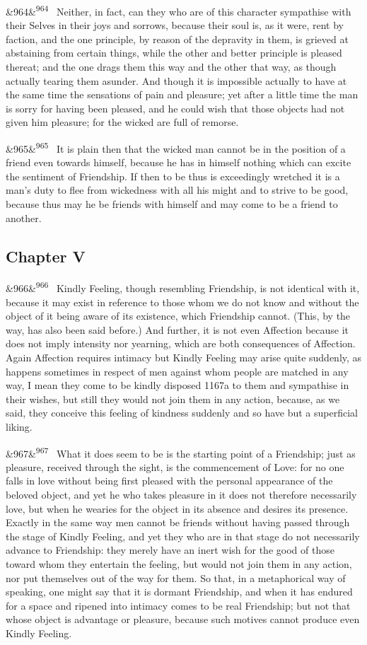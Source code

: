 \documentclass[12pt]{article}
\newcommand{\para}[1][]{\par\noindent\ifx&#1&\else\textsuperscript{\footnotesize #1}~\fi}
\begin{document}
\para[964] Neither, in fact, can they who are of this character sympathise with their Selves in their joys and sorrows, because their soul is, as it were, rent by faction, and the one principle, by reason of the depravity in them, is grieved at abstaining from certain things, while the other and better principle is pleased thereat; and the one drags them this way and the other that way, as though actually tearing them asunder. And though it is impossible actually to have at the same time the sensations of pain and pleasure; yet after a little time the man is sorry for having been pleased, and he could wish that those objects had not given him pleasure; for the wicked are full of remorse.

\para[965] It is plain then that the wicked man cannot be in the position of a friend even towards himself, because he has in himself nothing which can excite the sentiment of Friendship. If then to be thus is exceedingly wretched it is a man's duty to flee from wickedness with all his might and to strive to be good, because thus may he be friends with himself and may come to be a friend to another.

\subsection*{Chapter V}

\para[966] Kindly Feeling, though resembling Friendship, is not identical with it, because it may exist in reference to those whom we do not know and without the object of it being aware of its existence, which Friendship cannot. (This, by the way, has also been said before.) And further, it is not even Affection because it does not imply intensity nor yearning, which are both consequences of Affection. Again Affection requires intimacy but Kindly Feeling may arise quite suddenly, as happens sometimes in respect of men against whom people are matched in any way, I mean they come to be kindly disposed 1167a to them and sympathise in their wishes, but still they would not join them in any action, because, as we said, they conceive this feeling of kindness suddenly and so have but a superficial liking.

\para[967] What it does seem to be is the starting point of a Friendship; just as pleasure, received through the sight, is the commencement of Love: for no one falls in love without being first pleased with the personal appearance of the beloved object, and yet he who takes pleasure in it does not therefore necessarily love, but when he wearies for the object in its absence and desires its presence. Exactly in the same way men cannot be friends without having passed through the stage of Kindly Feeling, and yet they who are in that stage do not necessarily advance to Friendship: they merely have an inert wish for the good of those toward whom they entertain the feeling, but would not join them in any action, nor put themselves out of the way for them. So that, in a metaphorical way of speaking, one might say that it is dormant Friendship, and when it has endured for a space and ripened into intimacy comes to be real Friendship; but not that whose object is advantage or pleasure, because such motives cannot produce even Kindly Feeling.
\end{document}
